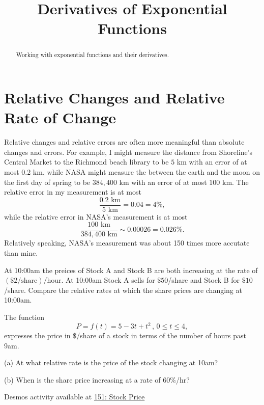 \documentclass{ximera}
\title{Derivatives of Exponential Functions}
\begin{document}
\begin{abstract}
Working with exponential functions and their derivatives.
\end{abstract}
\maketitle


\section*{Relative Changes and Relative Rate of Change}
Relative changes and relative errors are often more meaningful than absolute changes and errors. For example, I might measure the distance from Shoreline's Central Market to the Richmond beach library to be $5$ km with an  error of at most $0.2$ km, while NASA might measure the between the earth and the moon on the first day of spring to be $384,400$ km with an error of at most $100$ km. The relative error in my measurement is at most
\[
  \frac{0.2 \text{ km} }{5 \text{ km}} = 0.04 = 4\% ,
\] 
while the relative error in NASA's measurement is at most
\[ 
   \frac{100 \text{ km} }{384,400 \text{ km}} \sim 0.00026 = 0.026\% .
\]
Relatively speaking, NASA's measurement was about 150 times more accutate than mine.

\begin{question}  \label{Qfnljhn}
At 10:00am the preices of Stock A and Stock B are both increasing at the rate of $(\$2/\text{share})/\text{hour}$. At 10:00am Stock A sells for $\$50$/share and Stock B for $\$10$/share. Compare the relative rates at which the share prices are changing at 10:00am.
\end{question}


\begin{question} \label{Q43tbbtt}
The function 
\[
      P = f(t) = 5 -3t + t^2 \, , \, 0\leq t \leq 4 , 
\]
expresses the price in $\$$/share of a stock in terms of the number of hours past 9am.

(a) At what relative rate is the price of the stock changing at 10am? 

(b) When is the share price increasing at a rate of $60\%$/hr?



\begin{onlineOnly}
    \begin{center}
\end{center}
\end{onlineOnly}


Desmos activity available at \href{https://www.desmos.com/calculator/hhkveu6lxp}{151: Stock Price}



\end{question}
\end{document}
